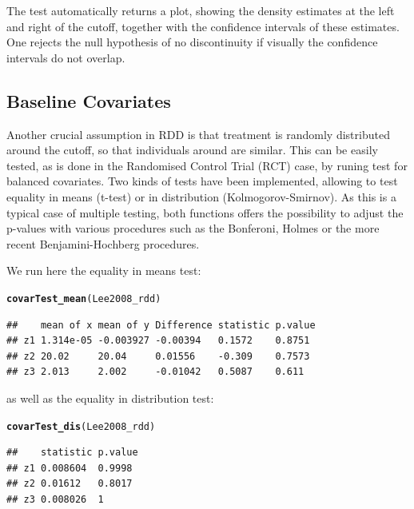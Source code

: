 \documentclass[english,nojss]{jss}\usepackage{graphicx, color}
\makeatletter
\newcommand{\hlfunctioncall}[1]{\textcolor[rgb]{0.501960784313725,0,0.329411764705882}{\textbf{#1}}}%
\newenvironment{kframe}{%
 \def\at@end@of@kframe{}%
 \ifinner\ifhmode%
  \def\at@end@of@kframe{\end{minipage}}%
  \begin{minipage}{\columnwidth}%
 \fi\fi%
 \def\FrameCommand##1{\hskip\@totalleftmargin \hskip-\fboxsep
 \colorbox{shadecolor}{##1}\hskip-\fboxsep
     \hskip-\linewidth \hskip-\@totalleftmargin \hskip\columnwidth}%
 \MakeFramed {\advance\hsize-\width
   \@totalleftmargin\z@ \linewidth\hsize
   \@setminipage}}%
 {\par\unskip\endMakeFramed%
 \at@end@of@kframe}
\newenvironment{knitrout}{}{} %
\makeatother
\begin{document}
The test automatically returns a plot, showing the density estimates
at the left and right of the cutoff, together with the confidence
intervals of these estimates. One rejects the null hypothesis of no
discontinuity if visually the confidence intervals do not overlap. 


\subsection{Baseline Covariates}

Another crucial assumption in RDD is that treatment is randomly distributed
around the cutoff, so that individuals around are similar. This can
be easily tested, as is done in the Randomised Control Trial (RCT)
case, by runing test for balanced covariates. Two kinds of tests have
been implemented, allowing to test equality in means (t-test) or in
distribution (Kolmogorov-Smirnov). As this is a typical case of multiple
testing, both functions offers the possibility to adjust the p-values
with various procedures such as the Bonferoni, Holmes or the more
recent Benjamini-Hochberg procedures. 

We run here the equality in means test:

\begin{knitrout}
\color{fgcolor}\begin{kframe}
\begin{alltt}
\hlfunctioncall{covarTest_mean}(Lee2008_rdd)
\end{alltt}
\begin{verbatim}
##    mean of x mean of y Difference statistic p.value
## z1 1.314e-05 -0.003927 -0.00394   0.1572    0.8751 
## z2 20.02     20.04     0.01556    -0.309    0.7573 
## z3 2.013     2.002     -0.01042   0.5087    0.611
\end{verbatim}
\end{kframe}
\end{knitrout}


as well as the equality in distribution test:

\begin{knitrout}
\color{fgcolor}\begin{kframe}
\begin{alltt}
\hlfunctioncall{covarTest_dis}(Lee2008_rdd)
\end{alltt}


{\ttfamily\noindent\color{warningcolor}{\#\# Warning: p-values will be approximate in the presence of ties}}\begin{verbatim}
##    statistic p.value
## z1 0.008604  0.9998 
## z2 0.01612   0.8017 
## z3 0.008026  1
\end{verbatim}
\end{kframe}
\end{knitrout}
\end{document}
